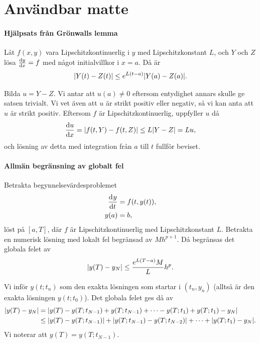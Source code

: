 \section{Användbar matte}

\paragraph{Hjälpsats från Grönwalls lemma}
Låt $f(x, y)$ vara Lipschitzkontinuerlig i $y$ med Lipschitzkonstant $L$, och $Y$ och $Z$ lösa $\dv{y}{x} = f$ med något initialvillkor i $x = a$. Då är
\begin{align*}
	\abs{Y(t) - Z(t)} \leq e^{L(t - a)}\abs{Y(a) - Z(a)}.
\end{align*}

\proof
Bilda $u = Y - Z$. Vi antar att $u(a) \neq 0$ eftersom entydighet annars skulle ge satsen trivialt. Vi vet även att $u$ är strikt positiv eller negativ, så vi kan anta att $u$ är strikt positiv. Eftersom $f$ är Lipschitzkontinuerlig, uppfyller $u$ då
\begin{align*}
	\dv{u}{x} = \abs{f(t, Y) - f(t, Z)} \leq L\abs{Y - Z} = Lu,
\end{align*}
och lösning av detta med integration från $a$ till $t$ fullför beviset.

\paragraph{Allmän begränsning av globalt fel}
Betrakta begynnelsevärdesproblemet
\begin{align*}
	\dv[]{y}{t} (t) &= f(t, y(t)), \\
	y(a)            &= b,
\end{align*}
löst på $[a, T]$, där $f$ är Lipschitzkontinuerlig med Lipschitzkonstant $L$. Betrakta en numerisk lösning med lokalt fel begränsad av $Mh^{p + 1}$. Då begränsas det globala felet av
\begin{align*}
	\abs{y(T) - y_{N}} \leq \frac{e^{L(T - a)}M}{L}h^{p}.
\end{align*}

\proof
Vi inför $y(t; t_{n})$ som den exakta lösningen som startar i $(t_{n}, y_{n})$ (alltså är den exakta lösningen $y(t; t_{0})$). Det globala felet ges då av
\begin{align*}
	\abs{y(T) - y_{N}} &= \abs{y(T) - y(T; t_{N - 1}) + y(T; t_{N - 1}) + \dots - y(T; t_{1}) + y(T; t_{1}) - y_{N}} \\
	                   &\leq \abs{y(T) - y(T; t_{N - 1})} + \abs{y(T; t_{N - 1}) - y(T; t_{N - 2})} + \dots + \abs{y(T; t_{1}) - y_{N}}.
\end{align*}
Vi noterar att $y(T) = y(T; t_{N - 1})$.

